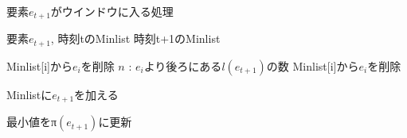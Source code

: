 \documentclass{IEEEtran}
\begin{document}
 
  \begin{algorithm}
 \caption{要素$e_{t+1}$がウインドウに入る処理}
 \begin{algorithmic}[1]
 \renewcommand{\algorithmicrequire}{\textbf{Input:}}
 \renewcommand{\algorithmicensure}{\textbf{Output:}}
 \REQUIRE 要素$e_{t+1}$, 時刻tのMinlist
 \ENSURE  時刻t+1のMinlist

  \STATE Minlist[i]から$e_i$を削除
  \ENDIF
   \STATE $n$ : $e_i$より後ろにある$l(e_{t+1})$の数
  \STATE Minlist[i]から$e_i$を削除
  \ENDIF
 \ENDFOR
 
 \STATE Minlistに$e_{t+1}$を加える
 
 \STATE 最小値をπ$(e_{t+1})$に更新
 \ENDIF
 
 \end{algorithmic} 
 \end{algorithm}
 
  
\end{document}
